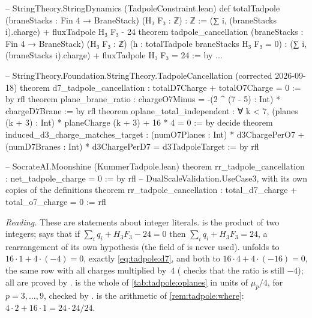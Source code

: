 \begin{leanbox}
\begin{leancode}
-- StringTheory.StringDynamics (TadpoleConstraint.lean)
def totalTadpole (braneStacks : Fin 4 → BraneStack) (H₃ F₃ : ℤ) : ℤ :=
  (∑ i, (braneStacks i).charge) + fluxTadpole H₃ F₃ - 24
theorem tadpole_cancellation (braneStacks : Fin 4 → BraneStack) (H₃ F₃ : ℤ)
    (h : totalTadpole braneStacks H₃ F₃ = 0) :
    (∑ i, (braneStacks i).charge) + fluxTadpole H₃ F₃ = 24 := by ...

-- StringTheory.Foundation.StringTheory.TadpoleCancellation (corrected 2026-09-18)
theorem d7_tadpole_cancellation : totalD7Charge + totalO7Charge = 0 := by rfl
theorem plane_brane_ratio : chargeO7Minus = -(2 ^ (7 - 5) : Int) * chargeD7Brane := by rfl
theorem oplane_total_independent :
    ∀ k < 7, (planes (k + 3) : Int) * planeCharge (k + 3) + 16 * 4 = 0 := by decide
theorem induced_d3_charge_matches_target :
    (numO7Planes : Int) * d3ChargePerO7 + (numD7Branes : Int) * d3ChargePerD7
      = d3TadpoleTarget := by rfl

-- SocrateAI.Moonshine (KummerTadpole.lean)
theorem rr_tadpole_cancellation : net_tadpole_charge = 0 := by rfl
-- DualScaleValidation.UseCase3, with its own copies of the definitions
theorem rr_tadpole_cancellation :
    total_d7_charge + total_o7_charge = 0 := rfl
\end{leancode}
\emph{Reading.} These are statements about integer literals.  is the
product of two integers;  says that if
$\sum_i q_i+H_3F_3-24=0$ then $\sum_iq_i+H_3F_3=24$, a rearrangement of its own hypothesis
(the  field of  is never used).
 unfolds to $16\cdot1+4\cdot(-4)=0$, exactly
\eqref{eq:tadpole:d7}, and both  to $16\cdot4+4\cdot(-16)=0$,
the same row with all charges multiplied by~$4$ ( checks that the ratio is
still $-4$); all are proved by .  is the whole of
\cref{tab:tadpole:oplanes} in units of $\mu_p/4$, for $p=3,\dots,9$, checked by .
 is the arithmetic of \cref{rem:tadpole:where}:
$4\cdot2+16\cdot1=24\cdot24/24$.


\end{leanbox}
